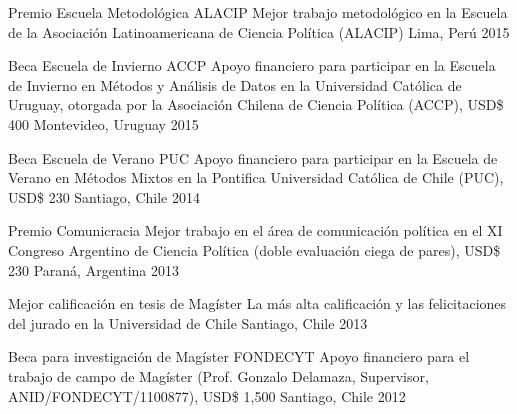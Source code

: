 \vspace{1mm}

\begin{cvhonors}
\cvhonor
{Premio Escuela Metodológica ALACIP}
{Mejor trabajo metodológico en la Escuela de la Asociación Latinoamericana de Ciencia Política (ALACIP)}
{Lima, Perú}
{2015}
\end{cvhonors}

\vspace{1mm}

\begin{cvhonors}
\cvhonor
{Beca Escuela de Invierno ACCP}
{Apoyo financiero para participar en la Escuela de Invierno en Métodos y Análisis de Datos en la Universidad Cat\'olica de Uruguay, otorgada por la Asociación Chilena de Ciencia Política (ACCP), USD{\$} 400}
{Montevideo, Uruguay}
{ 2015}
\end{cvhonors}

\vspace{1mm}

\begin{cvhonors}
\cvhonor
{Beca Escuela de Verano PUC}
{Apoyo financiero para participar en la Escuela de Verano en Métodos Mixtos en la Pontifica Universidad Cat\'olica de Chile (PUC), USD{\$} 230}
{Santiago, Chile}
{2014} 
\end{cvhonors}

\vspace{1mm}

\begin{cvhonors}
\cvhonor
{Premio Comunicracia}
{Mejor trabajo en el área de comunicación política en el XI Congreso Argentino de Ciencia Política (doble evaluación ciega de pares), USD{\$} 230}
{Paraná, Argentina}
{2013}
\end{cvhonors}

\vspace{1mm}

\begin{cvhonors}
\cvhonor
{Mejor calificación en tesis de Magíster}
{La más alta calificación y las felicitaciones del jurado en la Universidad de Chile}
{Santiago, Chile}
{2013}
\end{cvhonors}

\vspace{1mm}

\begin{cvhonors}
\cvhonor
{Beca para investigación de Mag\'ister FONDECYT}
{Apoyo financiero para el trabajo de campo de Magíster (Prof. Gonzalo Delamaza, Supervisor, ANID/FONDECYT/1100877), USD{\$} 1,500}
{Santiago, Chile}
{2012}
\end{cvhonors}

\vspace{1mm}
